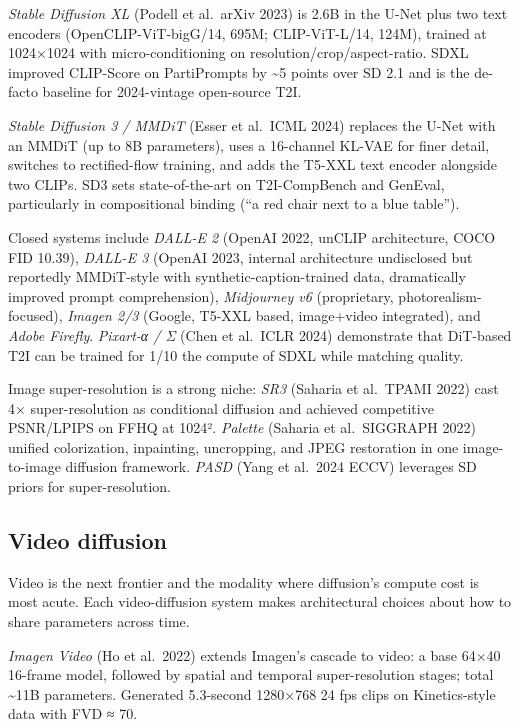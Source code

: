 \emph{Stable Diffusion XL} (Podell et al.~arXiv 2023) is 2.6B in the U-Net plus two text encoders (OpenCLIP-ViT-bigG/14, 695M; CLIP-ViT-L/14, 124M), trained at 1024×1024 with micro-conditioning on resolution/crop/aspect-ratio. SDXL improved CLIP-Score on PartiPrompts by \textasciitilde5 points over SD 2.1 and is the de-facto baseline for 2024-vintage open-source T2I.

\emph{Stable Diffusion 3 / MMDiT} (Esser et al.~ICML 2024) replaces the U-Net with an MMDiT (up to 8B parameters), uses a 16-channel KL-VAE for finer detail, switches to rectified-flow training, and adds the T5-XXL text encoder alongside two CLIPs. SD3 sets state-of-the-art on T2I-CompBench and GenEval, particularly in compositional binding (``a red chair next to a blue table'').

Closed systems include \emph{DALL-E 2} (OpenAI 2022, unCLIP architecture, COCO FID 10.39), \emph{DALL-E 3} (OpenAI 2023, internal architecture undisclosed but reportedly MMDiT-style with synthetic-caption-trained data, dramatically improved prompt comprehension), \emph{Midjourney v6} (proprietary, photorealism-focused), \emph{Imagen 2/3} (Google, T5-XXL based, image+video integrated), and \emph{Adobe Firefly}. \emph{Pixart-α / Σ} (Chen et al.~ICLR 2024) demonstrate that DiT-based T2I can be trained for 1/10 the compute of SDXL while matching quality.

Image super-resolution is a strong niche: \emph{SR3} (Saharia et al.~TPAMI 2022) cast 4× super-resolution as conditional diffusion and achieved competitive PSNR/LPIPS on FFHQ at 1024². \emph{Palette} (Saharia et al.~SIGGRAPH 2022) unified colorization, inpainting, uncropping, and JPEG restoration in one image-to-image diffusion framework. \emph{PASD} (Yang et al.~2024 ECCV) leverages SD priors for super-resolution.

\subsection{Video diffusion}\label{video-diffusion}

Video is the next frontier and the modality where diffusion's compute cost is most acute. Each video-diffusion system makes architectural choices about how to share parameters across time.

\emph{Imagen Video} (Ho et al.~2022) extends Imagen's cascade to video: a base 64×40 16-frame model, followed by spatial and temporal super-resolution stages; total \textasciitilde11B parameters. Generated 5.3-second 1280×768 24 fps clips on Kinetics-style data with FVD ≈ 70.

